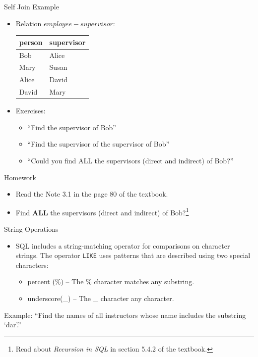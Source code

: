 \documentclass{beamer}
\begin{document}
\begin{frame}{Self Join Example}
    \begin{itemize}
        \item Relation $employee-supervisor$: \\
            \begin{center}
                \begin{tabular}{| l | l |}
                    \hline
                    \textbf{person} & \textbf{supervisor} \\
                    \hline
                    Bob & Alice \\ \hline
                    Mary & Susan \\ \hline
                    Alice & David \\ \hline
                    David & Mary \\ \hline
                \end{tabular}
            \end{center}
        \item Exercises:
        \begin{itemize}
            \item ``Find the supervisor of Bob''
            \item ``Find the supervisor of the supervisor of Bob''
            \item ``Could you find ALL the supervisors (direct and indirect) of Bob?''
        \end{itemize}
    \end{itemize}
\end{frame}

\begin{frame}{Homework}
    \begin{itemize}
        \item Read the Note 3.1 in the page 80 of the textbook.
        \item Find \textbf{ALL} the supervisors (direct and indirect) of Bob?\footnote{Read about \textit{Recursion in SQL} in section 5.4.2 of the textbook. }
    \end{itemize}
\end{frame}

\begin{frame}[fragile]{String Operations}
    \begin{itemize}
        \item SQL includes a string-matching operator for comparisons on character strings.  The operator \texttt{LIKE} uses patterns that are described using two special characters:
        \begin{itemize}
            \item percent (\%) -- The \% character matches any substring.
            \item underscore(\_) -- The \_ character any character.
        \end{itemize}
    \end{itemize}
    \begin{exampleblock}{Example:}
        ``Find the names of all instructors whose name includes the substring `dar'.''
    \end{exampleblock}
\end{frame}
\end{document}
